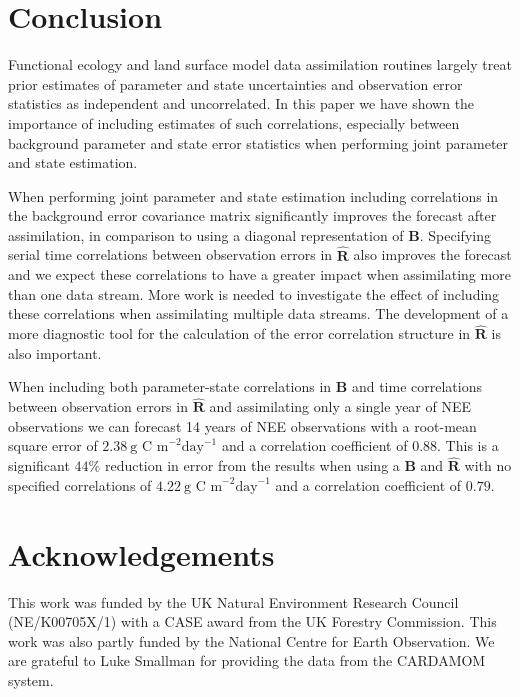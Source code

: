 \section{Conclusion}

Functional ecology and land surface model data assimilation routines largely treat prior estimates of parameter and state uncertainties and observation error statistics as independent and uncorrelated. In this paper we have shown the importance of including estimates of such correlations, especially between background parameter and state error statistics when performing joint parameter and state estimation.

When performing joint parameter and state estimation including correlations in the background error covariance matrix significantly improves the forecast after assimilation, in comparison to using a diagonal representation of $\textbf{B}$. Specifying serial time correlations between observation errors in $\hat{\textbf{R}}$ also improves the forecast and we expect these correlations to have a greater impact when assimilating more than one data stream. More work is needed to investigate the effect of including these correlations when assimilating multiple data streams. The development of a more diagnostic tool for the calculation of the error correlation structure in $\hat{\textbf{R}}$ is also important.  

When including both parameter-state correlations in $\textbf{B}$ and time correlations between observation errors in $\hat{\textbf{R}}$ and assimilating only a single year of NEE observations we can forecast 14 years of NEE observations with a root-mean square error of $2.38~\text{g C m}^{-2}\text{day}^{-1}$ and a correlation coefficient of $0.88$. This is a significant $44\%$ reduction in error from the results when using a $\textbf{B}$ and $\hat{\textbf{R}}$ with no specified correlations of $4.22~\text{g C m}^{-2}\text{day}^{-1}$ and a correlation coefficient of $0.79$.

\section{Acknowledgements}

This work was funded by the UK Natural Environment Research Council (NE/K00705X/1) with a CASE award from the UK Forestry Commission. This work was also partly funded by the National Centre for Earth Observation. We are grateful to Luke Smallman for providing the data from the CARDAMOM system.


